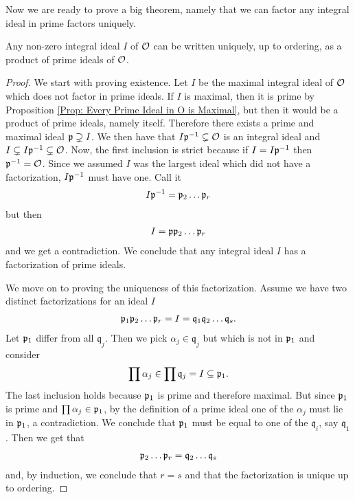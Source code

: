    Now we are ready to prove a big theorem, namely that we can factor any integral ideal in prime factors uniquely.
    \begin{theorem}
    Any non-zero integral ideal \(I\) of \(\mathcal{O}\) can be written uniquely, up to ordering, as a product of prime ideals of \(\mathcal{O}\). 
    \end{theorem}
    \begin{proof}
        We start with proving existence. Let \(I\) be the maximal integral ideal of \(\mathcal{O}\) which does not factor in prime ideals. If \(I\) is maximal, then it is prime by Proposition \ref{Prop: Every Prime Ideal in O is Maximal}, but then it would be a product of prime ideals, namely itself. Therefore there exists a prime and maximal ideal \(\mathfrak{p}\supsetneq I\). We then have that \(I\mathfrak{p}^{-1} \subsetneq \mathcal{O}\) is an integral ideal and \(I\subsetneq I\mathfrak{p}^{-1} \subsetneq \mathcal{O}\). Now, the first inclusion is strict because if \(I = I\mathfrak{p}^{-1}\) then \(\mathfrak{p}^{-1} = \mathcal{O}\). Since we assumed \(I\) was the largest ideal which did not have a factorization, \(I\mathfrak{p}^{-1}\) must have one. Call it
        \begin{align*}
            I\mathfrak{p}^{-1} = \mathfrak{p}_2\dots\mathfrak{p}_r
        \end{align*}
        but then
        \begin{align*}
            I = \mathfrak{p}\mathfrak{p}_2\dots\mathfrak{p}_r
        \end{align*}
        and we get a contradiction. We conclude that any integral ideal \(I\) has a factorization of prime ideals.\par
        We move on to proving the uniqueness of this factorization. Assume we have two distinct factorizations for an ideal \(I\)
        \begin{align*}
            \mathfrak{p}_1\mathfrak{p}_2\dots\mathfrak{p}_r = I = \mathfrak{q}_1\mathfrak{q}_2\dots\mathfrak{q}_s.
        \end{align*}
        Let \(\mathfrak{p}_1\) differ from all \(\mathfrak{q}_j\). Then we pick \(\alpha_j\in\mathfrak{q}_j\) but which is not in \(\mathfrak{p}_1\) and consider
        \begin{align*}
            \prod\alpha_j\in\prod\mathfrak{q}_j = I \subseteq \mathfrak{p}_1.
        \end{align*}
        The last inclusion holds because \(\mathfrak{p}_1\) is prime and therefore maximal. But since \(\mathfrak{p}_1\) is prime and \(\prod\alpha_j\in\mathfrak{p}_1\), by the definition of a prime ideal one of the \(\alpha_j\) must lie in \(\mathfrak{p}_1\), a contradiction. We conclude that \(\mathfrak{p}_1\) must be equal to one of the \(\mathfrak{q}_i\), say \(\mathfrak{q}_1\). Then we get that
        \begin{align*}
            \mathfrak{p}_2\dots\mathfrak{p}_r = \mathfrak{q}_2\dots\mathfrak{q}_s
        \end{align*}
        and, by induction, we conclude that \(r = s\) and that the factorization is unique up to ordering.
    \end{proof}

